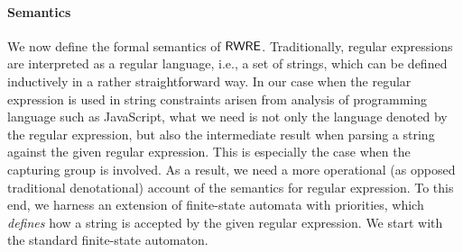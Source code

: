 
\paragraph{Semantics}
We now define the formal semantics of ${\sf RWRE}$. Traditionally, regular expressions are interpreted as a regular language, i.e., a set of strings, which can be defined inductively in a rather straightforward way. In our case when the regular expression is used in string constraints arisen from analysis of programming language such as JavaScript, %
what we need is not only the language denoted by the regular expression, but also the intermediate result when parsing a string against the given regular expression. This is especially the case when the capturing group is involved. As a result, we need a more operational (as opposed traditional denotational) account of the semantics for regular expression. To this end, we harness an extension of finite-state automata with priorities, which \emph{defines} how a string is accepted by the given regular expression. We start with the standard finite-state automaton.  


%
% 

%		

